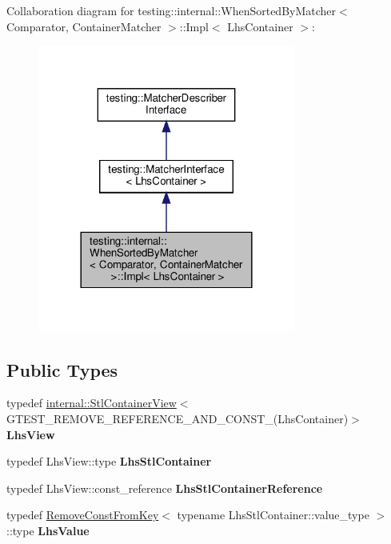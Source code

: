 Collaboration diagram for testing\+:\+:internal\+:\+:When\+Sorted\+By\+Matcher$<$ Comparator, Container\+Matcher $>$\+:\+:Impl$<$ Lhs\+Container $>$\+:
\nopagebreak
\begin{figure}[H]
\begin{center}
\leavevmode
\includegraphics[width=240pt]{classtesting_1_1internal_1_1_when_sorted_by_matcher_1_1_impl__coll__graph}
\end{center}
\end{figure}
\subsection*{Public Types}
\begin{DoxyCompactItemize}
\item 
\mbox{\label{classtesting_1_1internal_1_1_when_sorted_by_matcher_1_1_impl_a4c84fddfe1bf967a73e5dae1940db427}} 
typedef \hyperlink{classtesting_1_1internal_1_1_stl_container_view}{internal\+::\+Stl\+Container\+View}$<$ G\+T\+E\+S\+T\+\_\+\+R\+E\+M\+O\+V\+E\+\_\+\+R\+E\+F\+E\+R\+E\+N\+C\+E\+\_\+\+A\+N\+D\+\_\+\+C\+O\+N\+S\+T\+\_\+(Lhs\+Container)$>$ {\bfseries Lhs\+View}
\item 
\mbox{\label{classtesting_1_1internal_1_1_when_sorted_by_matcher_1_1_impl_a2cb1a8d85ca2c376b6abdbcb00d84759}} 
typedef Lhs\+View\+::type {\bfseries Lhs\+Stl\+Container}
\item 
\mbox{\label{classtesting_1_1internal_1_1_when_sorted_by_matcher_1_1_impl_ab5e53a762bb213ccf84299b31c825b58}} 
typedef Lhs\+View\+::const\+\_\+reference {\bfseries Lhs\+Stl\+Container\+Reference}
\item 
\mbox{\label{classtesting_1_1internal_1_1_when_sorted_by_matcher_1_1_impl_a93044f4ba53373fcfc424132b5e6c462}} 
typedef \hyperlink{structtesting_1_1internal_1_1_remove_const_from_key}{Remove\+Const\+From\+Key}$<$ typename Lhs\+Stl\+Container\+::value\+\_\+type $>$\+::type {\bfseries Lhs\+Value}
\end{DoxyCompactItemize}
